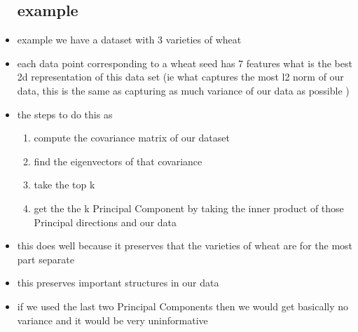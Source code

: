 \documentclass{article}
\begin{document}
\begin{itemize}
\subsection*{example}
\item example we have a dataset with 3 varieties of wheat 
\item each data point corresponding to a wheat seed has 7 features what is the best 2d representation of this data set (ie what captures the most l2 norm of our data, this is the same as capturing as much variance of our data as possible ) 
\item the steps to do this as 
\begin{enumerate}
    \item compute the covariance matrix of our dataset 
    \item find the eigenvectors of that covariance
    \item take the top k 
    \item get the the k Principal Component by taking the inner product of those Principal directions and our data 
\end{enumerate}
\item this does well because it preserves that the varieties of wheat are for the most part separate
\item this preserves important structures in our data 
\item if we used the last two Principal Components then  we would get basically no variance and it would be very uninformative

\end{itemize}
\end{document}
